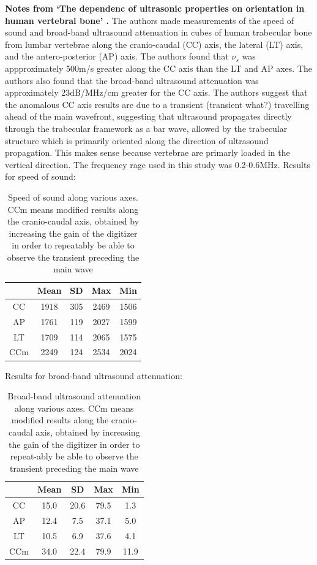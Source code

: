 \documentclass[11pt,titlepage]{article} %
\begin{document}
\textbf{Notes from `The dependenc of ultrasonic properties on orientation in human vertebral bone' \cite{nicholson1994dependence}.}
The authors made measurements of the speed of sound and broad-band ultrasound attenuation in cubes of human trabecular bone from lumbar vertebrae along the cranio-caudal (CC) axis, the lateral (LT) axis, and the antero-posterior (AP) axis.
The authors found that $\nu_s$ was appproximately 500m/s greater along the CC axis than the LT and AP axes. The authors also found that the broad-band ultrasound attenuation was approximately 23dB/MHz/cm greater for the CC axis. The authors suggest that the anomalous CC axis results are due to a transient (transient what?) travelling ahead of the main wavefront, suggesting that ultrasound propagates directly through the trabecular framework as a bar wave, allowed by the  trabecular structure which is primarily oriented along the direction of ultrasound propagation. This makes sense because vertebrae are primarly loaded in the vertical direction. The frequency rage used in this study was 0.2-0.6MHz. Results for speed of sound:

\begin{table}[!h]
\begin{center}
  \begin{tabular}{| c | c | c | c | c | }
    \hline
     & Mean & SD & Max & Min \\ \hline
     CC & 1918 & 305 & 2469 & 1506 \\ 
     AP & 1761 & 119 & 2027 & 1599 \\ 
     LT & 1709 & 114 & 2065 & 1575 \\ 
     CCm & 2249 & 124 & 2534 & 2024 \\
    \hline
  \end{tabular}
\end{center}
\caption{Speed of sound along various axes. CCm means modified results along the cranio-caudal axis, obtained by increasing the gain of the digitizer in order to repeatably be able to observe the transient preceding the main wave}
\end{table}
 
 Results for broad-band ultrasound attenuation:
 \begin{table}[!h]
\begin{center}
  \begin{tabular}{| c | c | c | c | c | }
    \hline
     & Mean & SD & Max & Min \\ \hline
     CC & 15.0 & 20.6 & 79.5 & 1.3 \\ 
     AP & 12.4 & 7.5 & 37.1 & 5.0 \\ 
     LT & 10.5 & 6.9 & 37.6 & 4.1 \\ 
     CCm & 34.0 & 22.4 & 79.9 & 11.9 \\
    \hline
  \end{tabular}
\end{center}
\caption{Broad-band ultrasound attenuation along various axes. CCm means modified results along the cranio-caudal axis, obtained by increasing the gain of the digitizer in order to repeat-ably be able to observe the transient preceding the main wave}
\end{table}
\end{document}
